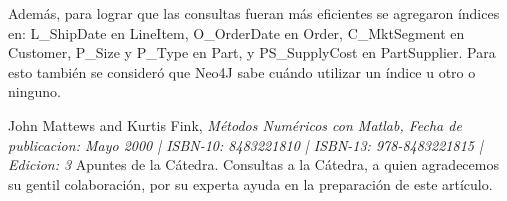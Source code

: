 \documentclass[10pt,journal,compsoc]{IEEEtran}
\begin{document}
Adem\'as, para lograr que las consultas fueran m\'as eficientes se agregaron \'indices en: L\_ShipDate en LineItem, O\_OrderDate en Order, C\_MktSegment en Customer, P\_Size y P\_Type en Part, y PS\_SupplyCost en PartSupplier. Para esto tambi\'en se consider\'o que Neo4J sabe cu\'ando utilizar un \'indice u otro o ninguno. 
\renewcommand{\refname}{Bibliograf\'ia}
\begin{thebibliography}{1}
John Mattews and Kurtis Fink, \emph{M\'etodos Num\'ericos con Matlab, Fecha de publicacion: Mayo 2000 | ISBN-10: 8483221810 | ISBN-13: 978-8483221815 | Edicion: 3}
 Apuntes de la C\'atedra.
 Consultas a la C\'atedra, a quien agradecemos su gentil colaboraci\'on, por su experta ayuda  en la preparaci\'on de este art\'iculo.

\end{thebibliography}
\end{document}
